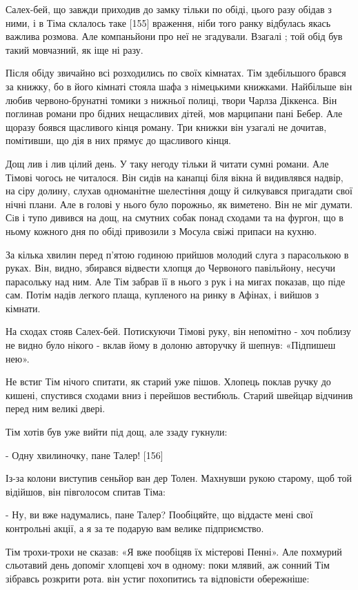 Салех-бей, що завжди приходив до замку тільки по обіді, цього разу обідав з ними, і в Тіма склалось таке [155] враження, ніби того ранку відбулась якась важлива розмова. Але компаньйони про неї не згадували. Взагалі ; той обід був такий мовчазний, як іще ні разу.

Після обіду звичайно всі розходились по своїх кімнатах. Тім здебільшого брався за книжку, бо в його кімнаті стояла шафа з німецькими книжками. Найбільше він любив червоно-брунатні томики з нижньої полиці, твори Чарлза Діккенса. Він поглинав романи про бідних нещасливих дітей, мов марципани пані Бебер. Але щоразу боявся щасливого кінця роману. Три книжки він узагалі не дочитав, помітивши, що дія в них прямує до щасливого кінця.

Дощ лив і лив цілий день. У таку негоду тільки й читати сумні романи. Але Тімові чогось не читалося. Він сидів на канапці біля вікна й видивлявся надвір, на сіру долину, слухав одноманітне шелестіння дощу й силкувався пригадати свої нічні плани. Але в голові у нього було порожньо, як виметено. Він не міг думати. Сiв і тупо дивився на дощ, на смутних собак понад сходами та на фургон, що в ньому кожного дня по обіді привозили з Мосула свіжі припаси на кухню.

За кілька хвилин перед п'ятою годиною прийшов молодий слуга з парасолькою в руках. Він, видно, збирався відвести хлопця до Червоного павільйону, несучи парасольку над ним. Але Тім забрав її в нього з рук і на мигах показав, що піде сам. Потім надів легкого плаща, купленого на ринку в Афінах, і вийшов з кімнати.

На сходах стояв Салех-бей. Потискуючи Тімові руку, він непомітно - хоч поблизу не видно було нікого - вклав йому в долоню авторучку й шепнув: «Підпишеш нею».

Не встиг Тім нічого спитати, як старий уже пішов. Хлопець поклав ручку до кишені, спустився сходами вниз і перейшов вестибюль. Старий швейцар відчинив перед ним великі двері.

Тім хотів був уже вийти під дощ, але ззаду гукнули:

- Одну хвилиночку, пане Талер! [156]

Із-за колони виступив сеньйор ван дер Толен. Махнувши рукою старому, щоб той відійшов, він півголосом спитав Тіма:

- Ну, ви вже надумались, пане Талер? Пообіцяйте, що віддасте мені свої контрольні акції, а я за те подарую вам велике підприємство.

Тім трохи-трохи не сказав: «Я вже пообіцяв їх містерові Пенні». Але похмурий сльотавий день допоміг хлопцеві хоч в одному: поки млявий, аж сонний Тім зібравсь розкрити рота. він устиг похопитись та відповісти обережніше:

